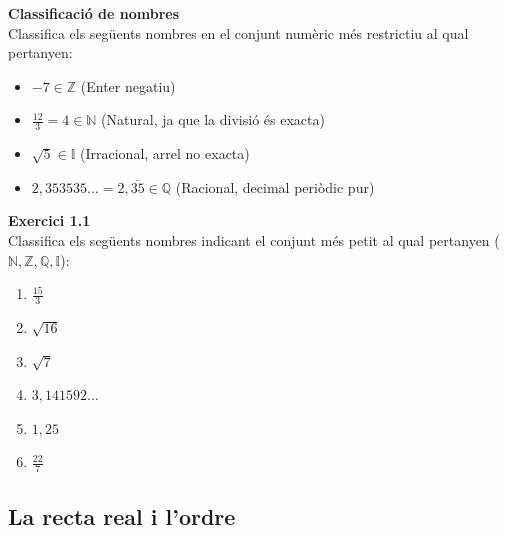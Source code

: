 \documentclass[12pt]{article}
\begin{document}
\begin{exemple}
\textbf{Classificació de nombres}\\
Classifica els següents nombres en el conjunt numèric més restrictiu al qual pertanyen:
\begin{itemize}
    \item $-7 \in \mathbb{Z}$ (Enter negatiu)
    \item $\frac{12}{3} = 4 \in \mathbb{N}$ (Natural, ja que la divisió és exacta)
    \item $\sqrt{5} \in \mathbb{I}$ (Irracional, arrel no exacta)
    \item $2{,}353535\dots = 2{,}\overline{35} \in \mathbb{Q}$ (Racional, decimal periòdic pur)
\end{itemize}
\end{exemple}

\begin{exercici}
\textbf{Exercici 1.1}\\
Classifica els següents nombres indicant el conjunt més petit al qual pertanyen ($\mathbb{N}, \mathbb{Z}, \mathbb{Q}, \mathbb{I}$):
\begin{enumerate}[label=\alph*)]
    \item $\frac{15}{3}$
    \item $\sqrt{16}$
    \item $\sqrt{7}$
    \item $3{,}141592\dots$
    \item $1{,}25$
    \item $\frac{22}{7}$
\end{enumerate}
\end{exercici}

\subsection{La recta real i l'ordre}
\end{document}
